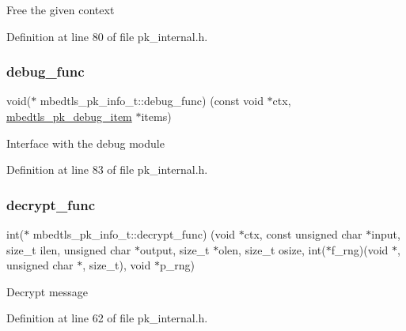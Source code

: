 Free the given context 

Definition at line 80 of file pk\+\_\+internal.\+h.

\mbox{\label{structmbedtls__pk__info__t_a61420d1702a434ff7084147cdc86bed3}} 
\subsubsection{\texorpdfstring{debug\+\_\+func}{debug\_func}}
{\footnotesize\ttfamily void($\ast$ mbedtls\+\_\+pk\+\_\+info\+\_\+t\+::debug\+\_\+func) (const void $\ast$ctx, \mbox{\hyperlink{structmbedtls__pk__debug__item}{mbedtls\+\_\+pk\+\_\+debug\+\_\+item}} $\ast$items)}

Interface with the debug module 

Definition at line 83 of file pk\+\_\+internal.\+h.

\mbox{\label{structmbedtls__pk__info__t_a32ef1fda6aedac78d5a28af612531162}} 
\subsubsection{\texorpdfstring{decrypt\+\_\+func}{decrypt\_func}}
{\footnotesize\ttfamily int($\ast$ mbedtls\+\_\+pk\+\_\+info\+\_\+t\+::decrypt\+\_\+func) (void $\ast$ctx, const unsigned char $\ast$input, size\+\_\+t ilen, unsigned char $\ast$output, size\+\_\+t $\ast$olen, size\+\_\+t osize, int($\ast$f\+\_\+rng)(void $\ast$, unsigned char $\ast$, size\+\_\+t), void $\ast$p\+\_\+rng)}

Decrypt message 

Definition at line 62 of file pk\+\_\+internal.\+h.

\mbox{\label{structmbedtls__pk__info__t_ae6aa9a5ebdd68db1fa364d786d9a1118}} 

